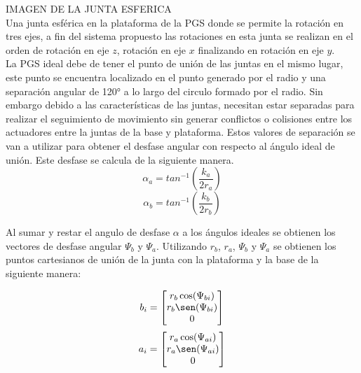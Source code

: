 \documentclass[letterpaper, 12pt]{article}
\begin{document}
IMAGEN DE LA JUNTA ESFERICA\\

Una junta esférica en la plataforma de la PGS donde se permite la rotación 
en tres ejes, a fin del sistema propuesto las rotaciones en esta junta se 
realizan en el orden de rotación en eje $z$, rotación en eje $x$ finalizando en 
rotación en eje $y$.\\

La PGS ideal debe de tener el punto de unión de las juntas en el mismo lugar, este 
punto se encuentra localizado en el punto generado por el radio y una separación angular 
de 120° a lo largo del circulo formado por el radio. Sin 
embargo debido a las características de las juntas, necesitan estar separadas para 
realizar el seguimiento de movimiento sin generar conflictos o colisiones entre los 
actuadores entre la juntas de la base y plataforma. Estos valores de separación se van 
a utilizar para obtener el desfase angular con respecto al ángulo ideal de unión. Este 
desfase se calcula de la siguiente manera. \\

\begin{equation} \label{equ:azi-a}
\alpha_a = tan^{-1}\left(\frac{k_a}{2r_a}\right)
\end{equation}
\begin{equation} \label{equ:azi-b}
\alpha_b = tan^{-1}\left(\frac{k_b}{2r_b}\right)
\end{equation}

Al sumar y restar el angulo de desfase $\alpha$ a los ángulos ideales se obtienen 
los vectores de desfase angular $\Psi_b$ y $\Psi_a$. Utilizando $r_b$, $r_a$, 
$\Psi_b$ y $\Psi_a$ se obtienen los puntos cartesianos de unión de la junta 
con la plataforma y la base de la siguiente manera:

\begin{equation} \label{equ:p_b}
b_i = \begin{bmatrix}
r_b\cos(\Psi_{bi})\\
r_b\sen(\Psi_{bi})\\
0\\
\end{bmatrix}
\end{equation}
\begin{equation} \label{equ:p_a}
a_i = \begin{bmatrix}
r_a\cos(\Psi_{ai})\\
r_a\sen(\Psi_{ai})\\
0\\
\end{bmatrix}
\end{equation}
\end{document}
